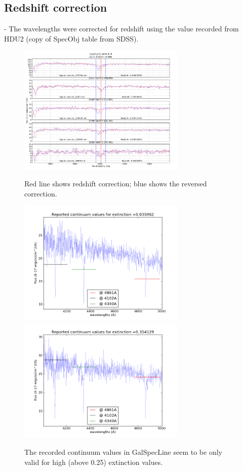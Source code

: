 \documentclass[preprint]{aastex}
\begin{document}
\subsection{Redshift correction}
- The wavelengths were corrected for redshift using the value recorded from HDU2 (copy of SpecObj table from SDSS).\\
\begin{figure}
\includegraphics[width=8cm]{splines_correct}\\
\caption{Red line shows redshift correction; blue shows the reversed correction.}
\end{figure}

\begin{figure}
\includegraphics[width=8cm]{035}\includegraphics[width=8cm]{355}\\
\caption{The recorded continuum values in GalSpecLine seem to be only valid for high (above 0.25) extinction values.}
\end{figure}
\end{document}
